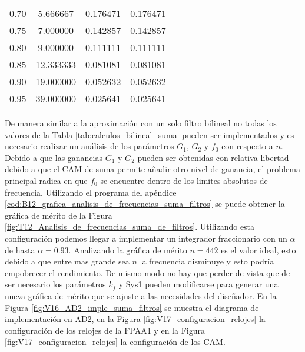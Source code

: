 \begin{table}[!hbp]
\begin{tabular}{cccc}
			0.70 & 5.666667 & 0.176471 & 0.176471 \\ 
			                                  
			0.75 & 7.000000 & 0.142857 & 0.142857 \\ 
			                                   
			0.80 & 9.000000 & 0.111111 & 0.111111 \\ 
			                                 
			0.85 & 12.333333 & 0.081081 & 0.081081 \\
			                                  
			0.90 & 19.000000 & 0.052632 & 0.052632 \\
			                                  
			0.95 & 39.000000 & 0.025641 & 0.025641 \\
			\hline                                              
			\end{tabular}                                                                
	\end{table} 

	De manera similar a la aproximación con un solo filtro bilineal no todas los valores de la Tabla \ref{tab:calculos_bilineal_suma} pueden ser implementados y es necesario realizar un análisis de los parámetros $G_{1}$, $G_{2}$ y $f_{0}$ con respecto a $n$. Debido a que las ganancias $G_{1}$ y $G_{2}$ pueden ser obtenidas con relativa libertad debido a que el CAM de suma permite añadir otro nivel de ganancia, el problema principal radica en que $f_{0}$ se encuentre dentro de los limites absolutos de frecuencia. Utilizando el programa del apéndice \ref{cod:B12_grafica_analisis_de_frecuencias_suma_filtros} se puede obtener la gráfica de mérito de la Figura \ref{fig:T12_Analisis_de_frecuencias_suma_de_filtros}. Utilizando esta configuración podemos llegar a implementar un integrador fraccionario con un $\alpha$ de hasta $\alpha = 0.93$. Analizando la gráfica de mérito $n = 442$ es el valor ideal, esto debido a que entre mas grande sea $n$ la frecuencia disminuye y esto podría empobrecer el rendimiento. De mismo modo no hay que perder de vista que de ser necesario los parámetros $k_{f}$ y Sys1 pueden modificarse para generar una nueva gráfica de mérito que se ajuste a las necesidades del diseñador. En la Figura  \ref{fig:V16_AD2_imple_suma_filtros} se muestra el diagrama de implementación en AD2, en la Figura \ref{fig:V17_configuracion_relojes} la configuración de los relojes de la FPAA1 y en la Figura \ref{fig:V17_configuracion_relojes} la configuración de los CAM.
	
